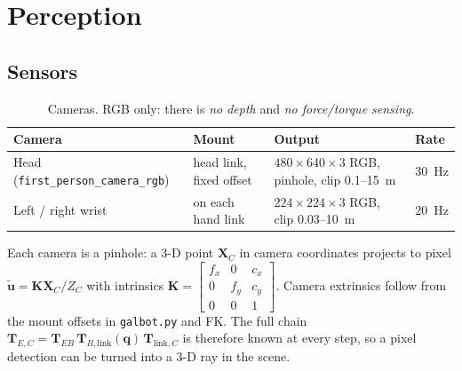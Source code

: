 \documentclass[10pt,a4paper]{article}
\begin{document}
\section{Perception}
\subsection{Sensors}
\begin{table}[h]\centering\footnotesize
\begin{tabular}{@{}llll@{}}
\toprule
Camera & Mount & Output & Rate\\
\midrule
Head (\texttt{first\_person\_camera\_rgb}) & head link, fixed offset & $480\times640\times3$ RGB, pinhole, clip 0.1--\SI{15}{\metre} & \SI{30}{\hertz}\\
Left / right wrist & on each hand link & $224\times224\times3$ RGB, clip 0.03--\SI{10}{\metre} & \SI{20}{\hertz}\\
\bottomrule
\end{tabular}
\caption{Cameras. RGB only: there is \emph{no depth} and \emph{no force/torque sensing}.}
\end{table}
\noindent Each camera is a pinhole: a 3-D point $\bm X_C$ in camera coordinates projects to pixel $\tilde{\bm u}=\bm K\bm X_C/Z_C$ with intrinsics $\bm K=\begin{bmatrix}f_x&0&c_x\\0&f_y&c_y\\0&0&1\end{bmatrix}$. Camera extrinsics follow from the mount offsets in \texttt{galbot.py} and FK. The full chain $\bm T_{E,C}=\bm T_{EB}\,\bm T_{B,\text{link}}(\bm q)\,\bm T_{\text{link},C}$ is therefore known at every step, so a pixel detection can be turned into a 3-D ray in the scene.
\end{document}
